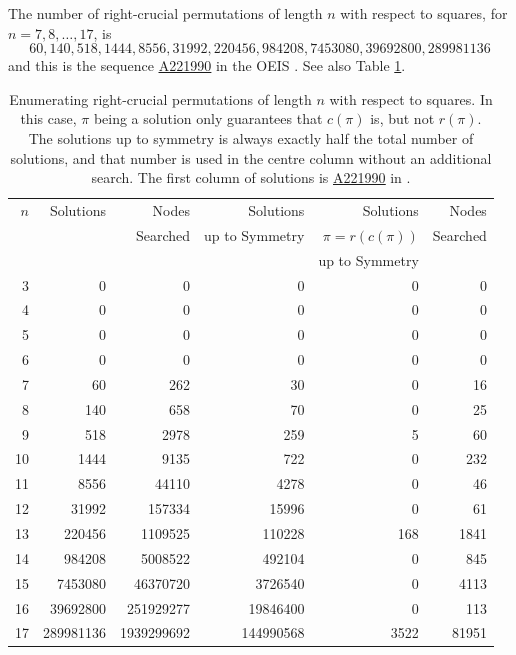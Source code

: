\documentclass[12pt,reqno]{article}
\newcommand{\seqnum}[1]{\href{http://oeis.org/#1}{\underline{#1}}}
\begin{document}
The number of right-crucial permutations of length $n$ with respect to squares, for $n=7,8,\ldots, 17$, is 
$$60, 140, 518, 1444, 8556, 31992, 220456, 984208, 7453080, 39692800, 289981136$$
and this is the sequence  \seqnum{A221990} in the OEIS \cite{OEIS}. See also Table \ref{tab:right-crucial}.

\begin{table}[H]
\begin{center}
\begin{tabular}{r|rr|r|rr}
$n$ & Solutions & Nodes & Solutions  & Solutions & Nodes \\ 
  &  & Searched &up to Symmetry & $\pi=r(c(\pi))$& Searched \\
 &  & & & up to Symmetry& \\ \hline
 3 &            0 &            0 &            0 &            0 &            0 \\
 4 &            0 &            0 &            0 &            0 &            0 \\
 5 &            0 &            0 &            0 &            0 &            0 \\
 6 &            0 &            0 &            0 &            0 &            0 \\
 7 &           60 &          262 &           30 &            0 &           16 \\
 8 &          140 &          658 &           70 &            0 &           25 \\
 9 &          518 &         2978 &          259 &            5 &           60 \\
10 &         1444 &         9135 &          722 &            0 &          232 \\
11 &         8556 &        44110 &         4278 &            0 &           46 \\
12 &        31992 &       157334 &        15996 &            0 &           61 \\
13 &       220456 &      1109525 &       110228 &          168 &         1841 \\
14 &       984208 &      5008522 &       492104 &            0 &          845 \\
15 &      7453080 &     46370720 &      3726540 &            0 &         4113 \\
16 &     39692800 &    251929277 &     19846400 &            0 &          113 \\
17 &    289981136 &   1939299692 &    144990568 &         3522 &        81951 \\
\end{tabular}
\end{center}
\caption{Enumerating right-crucial permutations of length $n$ with respect to squares.  In this case, $\pi$ being a solution only guarantees that $c(\pi)$ is, but not $r(\pi)$.  The solutions up to symmetry is always exactly half the total number of solutions, and that number is used in the centre column without an additional search.
The first column of solutions is \seqnum{A221990} in \cite{OEIS}.}
\label{tab:right-crucial}
\end{table}
\end{document}
